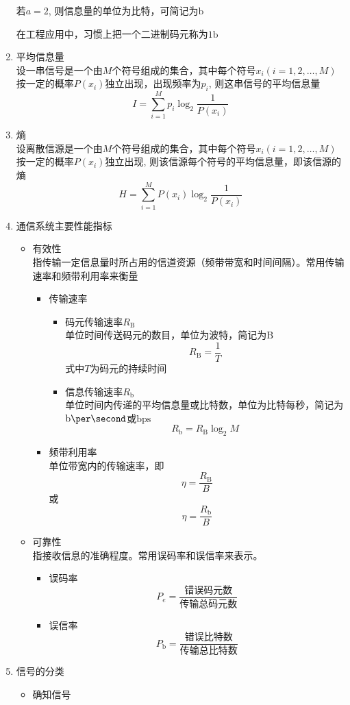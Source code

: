 \documentclass[UTF8]{ctexrep}
\def\bit{{\mathrm{b}}}
\def\Baud{{\mathrm{B}}}
\begin{document}
\begin{enumerate}
若$a=2$, 则信息量的单位为比特，可简记为$\bit$\par
在工程应用中，习惯上把一个二进制码元称为$1\bit$
\item 平均信息量\\
设一串信号是一个由$M$个符号组成的集合，其中每个符号$x_i(i=1, 2,\ldots, M)$按一定的概率$P(x_i)$独立出现，出现频率为$p_i$, 则这串信号的平均信息量
\[
I=\sum_{i=1}^Mp_i\log_2\frac{1}{P(x_i)}
\]
\item 熵\\
设离散信源是一个由$M$个符号组成的集合，其中每个符号$x_i(i=1, 2,\ldots, M)$按一定的概率$P(x_i)$独立出现, 则该信源每个符号的平均信息量，即该信源的熵
\[
H=\sum_{i=1}^MP(x_i)\log_2\frac{1}{P(x_i)}
\]
\item 通信系统主要性能指标
\begin{itemize}
\item 有效性\\
指传输一定信息量时所占用的信道资源（频带带宽和时间间隔）。常用传输速率和频带利用率来衡量
\begin{itemize}
\item 传输速率
\begin{itemize}
\item 码元传输速率$R_\Baud$\\
单位时间传送码元的数目，单位为波特，简记为$\Baud$
\[
R_\Baud=\frac{1}{T}
\]
式中$T$为码元的持续时间
\item 信息传输速率$R_\bit$\\
单位时间内传递的平均信息量或比特数，单位为比特每秒，简记为$\bit\per\second$或$\mathrm{bps}$
\[
R_\bit=R_\Baud\log_2M
\]
\end{itemize}
\item 频带利用率\\
单位带宽内的传输速率，即
\[
\eta=\frac{R_\Baud}{B}
\]
或
\[
\eta =\frac{R_\bit}{B}
\]
\end{itemize}
\item 可靠性\\
指接收信息的准确程度。常用误码率和误信率来表示。
\begin{itemize}
\item 误码率
\[
P_e=\frac{\text{错误码元数}}{\text{传输总码元数}}
\]
\item 误信率
\[
P_\bit=\frac{\text{错误比特数}}{\text{传输总比特数}}
\]
\end{itemize}
\end{itemize}
\item 信号的分类
\begin{itemize}
\item 确知信号\\

\end{itemize}
\end{enumerate}
\end{document}
